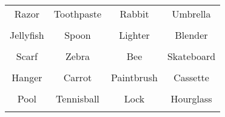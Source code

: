 \documentclass[12pt,a4paper]{article}
\begin{document}
\thispagestyle{empty}
\begin{table}[]
\centering
\Huge
\begin{tabular}{cccc}
 Razor& Toothpaste& Rabbit& Umbrella\\  & & & \\
 Jellyfish& Spoon& Lighter& Blender\\  & & & \\
 Scarf& Zebra& Bee& Skateboard\\  & & & \\
 Hanger& Carrot& Paintbrush& Cassette\\  & & & \\
 Pool& Tennisball& Lock& Hourglass\\  & & & \\
\end{tabular}
\end{table}
\end{document}
